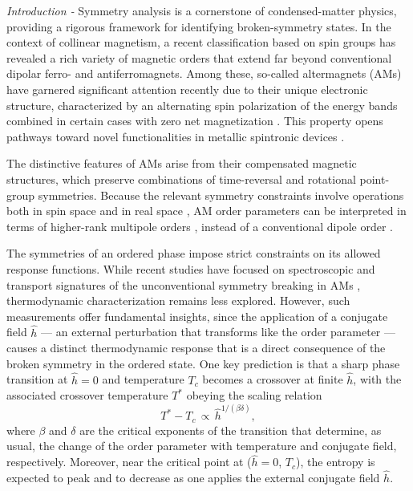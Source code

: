 \documentclass[
 reprint,










 amsmath,amssymb,
 aps,






]{revtex4-2}
\begin{document}
\maketitle



\textit{Introduction - }Symmetry analysis is a cornerstone of condensed-matter physics, providing a rigorous framework for identifying broken-symmetry states. In the context of collinear magnetism, a recent classification based on spin groups has revealed a rich variety of magnetic orders that extend far beyond conventional dipolar ferro- and antiferromagnets. Among these, so-called altermagnets (AMs) \cite{Smejkal22b,Smejkal22,Jungwirth25} have garnered significant attention recently due to their unique electronic structure, characterized by an alternating spin polarization \cite{Smejkal2020_AM,Hayami19} of the energy bands combined in certain cases with zero net magnetization \cite{Fernandes2024_AM}. This property opens pathways toward novel functionalities in metallic spintronic devices \cite{Smejkal22,Jungwirth2025spintronics}.

The distinctive features of AMs arise from their compensated magnetic structures, which preserve combinations of time-reversal and rotational point-group symmetries. Because the relevant symmetry constraints involve operations both in spin space and in real space \cite{Brinkmann66,Litvin74}, AM order parameters can be interpreted in terms of higher-rank multipole orders \cite{Bho24,Fernandes2024_AM,McC24,Schiff2024,Jaeschke2025,Buiarelli2025}, instead of a conventional dipole order \cite{Hayami20}.

The symmetries of an ordered phase impose strict constraints on its allowed response functions. While recent studies have focused on spectroscopic and transport signatures of the unconventional symmetry breaking in AMs \cite{Jungwirth25b,Hariki24,Krempasky24}, thermodynamic characterization remains less explored. However, such measurements offer fundamental insights, since the application of a conjugate field $\hat{h}$ — an external perturbation that transforms like the order parameter — causes a distinct thermodynamic response that is a direct consequence of the broken symmetry in the ordered state. One key prediction is that a sharp phase transition at $\hat{h}=0$ and temperature $T_c$ becomes a crossover at finite $\hat{h}$, with the associated crossover temperature $T^*$ obeying the scaling relation
\begin{equation}
T^*-T_c\,\propto\,\hat{h}^{1/(\beta \delta)},
\label{eq:Tstar}
\end{equation}
where $\beta$ and $\delta$ are the critical exponents of the transition that determine, as usual,  the change of the order parameter with temperature and conjugate field, respectively.  Moreover, near the critical point at ($\hat{h}=0$, $T_c$), the entropy is expected to peak  and to decrease as one applies the external conjugate field $\hat{h}$.
\end{document}
